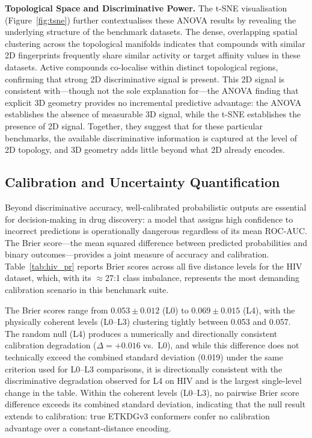 \documentclass[pdflatex,sn-vancouver-num]{sn-jnl}%
\theoremstyle{thmstyleone}%
\theoremstyle{thmstyletwo}%
\theoremstyle{thmstylethree}%
\begin{document}
\textbf{Topological Space and Discriminative Power.}
The t-SNE visualisation (Figure~\ref{fig:tsne}) further contextualises these ANOVA results by revealing the underlying structure of the benchmark datasets. The dense, overlapping spatial clustering across the topological manifolds indicates that compounds with similar 2D fingerprints frequently share similar activity or target affinity values in these datasets. Active compounds co-localise within distinct topological regions, confirming that strong 2D discriminative signal is present. This 2D signal is consistent with---though not the sole explanation for---the ANOVA finding that explicit 3D geometry provides no incremental predictive advantage: the ANOVA establishes the absence of measurable 3D signal, while the t-SNE establishes the presence of 2D signal. Together, they suggest that for these particular benchmarks, the available discriminative information is captured at the level of 2D topology, and 3D geometry adds little beyond what 2D already encodes.

\subsection{Calibration and Uncertainty Quantification}
\label{ssec:calibration}

Beyond discriminative accuracy, well-calibrated probabilistic outputs are essential for decision-making in drug discovery: a model that assigns high confidence to incorrect predictions is operationally dangerous regardless of its mean ROC-AUC.  The Brier score---the mean squared difference between predicted probabilities and binary outcomes---provides a joint measure of accuracy and calibration.  Table~\ref{tab:hiv_pr} reports Brier scores across all five distance levels for the HIV dataset, which, with its $\approx$27:1 class imbalance, represents the most demanding calibration scenario in this benchmark suite.

The Brier scores range from $0.053 \pm 0.012$ (L0) to $0.069 \pm 0.015$ (L4), with the physically coherent levels (L0--L3) clustering tightly between 0.053 and 0.057.  The random null (L4) produces a numerically and directionally consistent calibration degradation ($\Delta = +0.016$ vs.\ L0), and while this difference does not technically exceed the combined standard deviation (0.019) under the same criterion used for L0--L3 comparisons, it is directionally consistent with the discriminative degradation observed for L4 on HIV and is the largest single-level change in the table.  Within the coherent levels (L0--L3), no pairwise Brier score difference exceeds its combined standard deviation, indicating that the null result extends to calibration: true ETKDGv3 conformers confer no calibration advantage over a constant-distance encoding.
\end{document}
